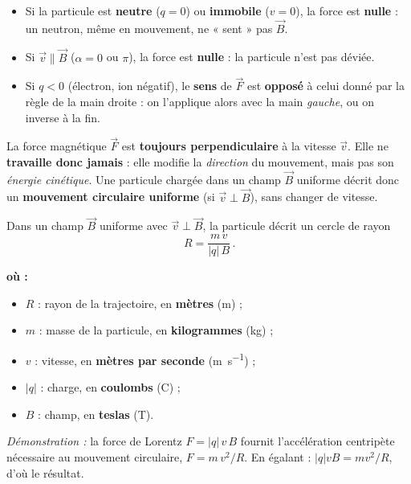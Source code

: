 \documentclass[11pt,a4paper]{article}
\newenvironment{ou}{%
  \par\smallskip\noindent\textbf{où :}\nopagebreak
  \begin{itemize}[leftmargin=1.8em,topsep=2pt,itemsep=1.5pt,parsep=0pt]}%
  {\end{itemize}}
\newcommand{\Bvec}{\vec{B}}
\newcommand{\Fvec}{\vec{F}}
\newcommand{\vvec}{\vec{v}}
\begin{document}
\begin{attention}
\hfill
\begin{itemize}[leftmargin=1.6em,topsep=2pt,itemsep=1pt]
  \item Si la particule est \textbf{neutre} ($q=0$) ou \textbf{immobile} ($v=0$), la force est
        \textbf{nulle} : un neutron, même en mouvement, ne « sent » pas $\Bvec$.
  \item Si $\vvec \parallel \Bvec$ ($\alpha=0$ ou $\pi$), la force est \textbf{nulle} : la particule
        n'est pas déviée.
  \item Si $q<0$ (électron, ion négatif), le \textbf{sens} de $\Fvec$ est \textbf{opposé} à celui
        donné par la règle de la main droite : on l'applique alors avec la main \emph{gauche}, ou
        on inverse à la fin.
\end{itemize}
\end{attention}

\begin{theoreme}
La force magnétique $\Fvec$ est \textbf{toujours perpendiculaire} à la vitesse $\vvec$. Elle ne
\textbf{travaille donc jamais} : elle modifie la \emph{direction} du mouvement, mais pas son
\emph{énergie cinétique}. Une particule chargée dans un champ $\Bvec$ uniforme décrit donc un
\textbf{mouvement circulaire uniforme} (si $\vvec\perp\Bvec$), sans changer de vitesse.
\end{theoreme}

\begin{formule}
Dans un champ $\Bvec$ uniforme avec $\vvec\perp\Bvec$, la particule décrit un cercle de rayon
\[ \boxed{\,R = \dfrac{m\, v}{|q|\, B}\,}. \]
\begin{ou}
  \item $R$ : rayon de la trajectoire, en \textbf{mètres} (\si{\metre}) ;
  \item $m$ : masse de la particule, en \textbf{kilogrammes} (\si{\kilogram}) ;
  \item $v$ : vitesse, en \textbf{mètres par seconde} (\si{\metre\per\second}) ;
  \item $|q|$ : charge, en \textbf{coulombs} (\si{\coulomb}) ;
  \item $B$ : champ, en \textbf{teslas} (\si{\tesla}).
\end{ou}
\textit{Démonstration :} la force de Lorentz $F=|q|\,v\,B$ fournit l'accélération centripète
nécessaire au mouvement circulaire, $F=m\,v^2/R$. En égalant : $|q|vB = mv^2/R$, d'où le résultat.
\end{formule}
\end{document}
